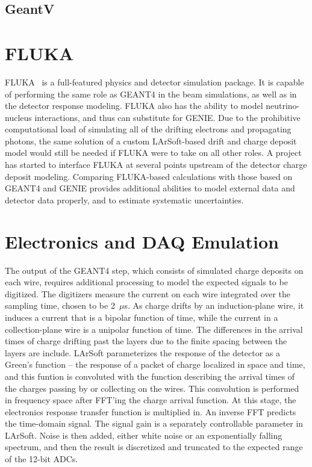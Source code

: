 \subsection{GeantV}

\section{FLUKA}

FLUKA~\cite{FLUKA} is a full-featured physics and detector simulation package.  It is capable of
performing the same role as GEANT4 in the beam simulations, as well as in the detector response modeling.
FLUKA also has the ability to model neutrino-nucleus interactions, and thus can substitute for GENIE.
Due to the prohibitive computational load of simulating all of the drifting electrons and propagating
photons, the same solution of a custom LArSoft-based drift and charge deposit model would still be needed
if FLUKA were to take on all other roles.  A project has started to interface FLUKA at several points upstream
of the detector charge deposit modeling.  Comparing FLUKA-based calculations with those based on GEANT4 and
GENIE provides additional abilities to model external data and detector data properly, and to estimate
systematic uncertainties.

\section{Electronics and DAQ Emulation}

The output of the GEANT4 step, which consists of simulated charge deposits on each wire, requires
additional processing to model the expected signals to be digitized.  The digitizers measure the
current on each wire integrated over the sampling time, chosen to be 2~$\mu$s.  As charge drifts
by an induction-plane wire, it induces a current that is a bipolar function of time, while the
current in a collection-plane wire is a unipolar function of time.  The differences in the arrival
times of charge drifting past the layers due to the finite spacing between the layers are include.
LArSoft parameterizes the response
of the detector as a Green's function -- the response of a packet of charge localized in space and time,
and this funtion is convoluted with the function describing the arrival times of the charges passing by
or collecting on the wires.  This convolution is performed in frequency space after FFT'ing the charge
arrival function.  At this stage, the electronics response transfer function is multiplied in.  An inverse
FFT predicts the time-domain signal.  The signal gain is a separately controllable parameter in LArSoft.
  Noise is then added, either white noise or an exponentially falling
spectrum, and then the result is discretized and truncated to the expected range of the 12-bit ADCs.  

